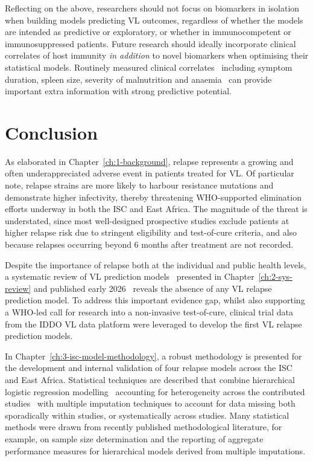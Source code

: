 Reflecting on the above, researchers should not focus on biomarkers in isolation when building models predicting VL outcomes, regardless of whether the models are intended as predictive or exploratory, or whether in immunocompetent or immunosuppressed patients. Future research should ideally incorporate clinical correlates of host immunity \textit{in addition} to novel biomarkers when optimising their statistical models. Routinely measured clinical correlates \textemdash\ including symptom duration, spleen size, severity of malnutrition and anaemia \textemdash\ can provide important extra information with strong predictive potential.

\section{Conclusion}

As elaborated in Chapter~\ref{ch:1-background}, relapse represents a growing and often underappreciated adverse event in patients treated for VL. Of particular note, relapse strains are more likely to harbour resistance mutations and demonstrate higher infectivity, thereby threatening WHO-supported elimination efforts underway in both the ISC and East Africa. The magnitude of the threat is understated, since most well-designed prospective studies exclude patients at higher relapse risk due to stringent eligibility and test-of-cure criteria, and also because relapses occurring beyond 6 months after treatment are not recorded.

Despite the importance of relapse both at the individual and public health levels, a systematic review of VL prediction models \textemdash\ presented in Chapter~\ref{ch:2-sys-review} and published early 2026\cite{wilson2026} \textemdash\ reveals the absence of any VL relapse prediction model. To address this important evidence gap, whilst also supporting a WHO-led call for research into a non-invasive test-of-cure\cite{WHO2024_Leishmaniasis}, clinical trial data from the IDDO VL data platform were leveraged to develop the first VL relapse prediction models.

In Chapter~\ref{ch:3-isc-model-methodology}, a robust methodology is presented for the development and internal validation of four relapse models across the ISC and East Africa. Statistical techniques are described that combine hierarchical logistic regression modelling \textemdash\ accounting for heterogeneity across the contributed studies \textemdash\ with multiple imputation techniques to account for data missing both sporadically within studies, or systematically across studies. Many statistical methods were drawn from recently published methodological literature, for example, on sample size determination and the reporting of aggregate performance measures for hierarchical models derived from multiple imputations.

